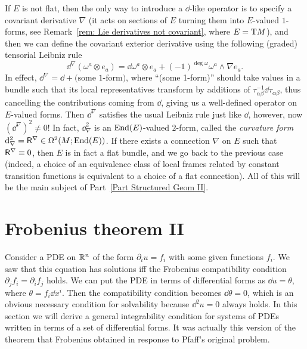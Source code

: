\begin{rem}
    If $E$ is not flat, then the only way to introduce a $\dd$-like operator is to specify a covariant derivative $\nabla$ (it acts on sections of $E$ turning them into $E$-valued $1$-forms, see Remark~\ref{rem: Lie derivatives not covariant}, where $E=\mathrm{T} M$), and then we can define the covariant exterior derivative using the following (graded) tensorial Leibniz rule
    \[\dd^\nabla(\omega^a\otimes e_a)=\dd\omega^a\otimes e_a+(-1)^{\deg \omega}\omega^a\wedge\nabla e_a.\]
    In effect, $\dd^\nabla=\dd +\text{(some 1-form)}$, where ``(some 1-form)'' should take values in a bundle such that its local representatives transform by additions of $\tau_{\alpha\beta}^{-1}\dd\tau_{\alpha\beta}$, thus cancelling the contributions coming from $\dd$, giving us a well-defined operator on $E$-valued forms.
    Then $\dd^\nabla$ satisfies the usual Leibniz rule just like $\dd$, however, now $(\dd^\nabla)^2\neq 0$! In fact, $\dd_\nabla^2$ is an $\operatorname{End}(E)$-valued $2$-form, called the \emph{curvature form} ${\mathrm{d}}_\nabla^2=\mathsf{R}^\nabla\in\Omega^2(M;\operatorname{End}(E))$. If there exists a connection $\nabla$ on $E$ such that $\mathsf{R}^\nabla\equiv 0$, then $E$ is in fact a flat bundle, and we go back to the previous case (indeed, a choice of an equivalence class of local frames related by constant transition functions is equivalent to a choice of a flat connection). All of this will be the main subject of Part~\ref{Part Structured Geom II}.
\end{rem}

\section{Frobenius theorem II}\label{sec: frobenius ii}


Consider a PDE on $\mathbb{R}^n$ of the form $\partial_i u=f_i$ with some given functions $f_i$. We saw that this equation has solutions iff the Frobenius compatibility condition $\partial_jf_i=\partial_i f_j$ holds. We can put the PDE in terms of differential forms as $\dd u=\theta$, where $\theta=f_i\dd x^i$. Then the compatibility condition becomes $\dd \theta=0$, which is an obvious necessary condition for solvability because $\dd ^2 u=0$ always holds. In this section we will derive a general integrability condition for systems of PDEs written in terms of a set of differential forms. It was actually this version of the theorem that Frobenius obtained in response to Pfaff's original problem.

